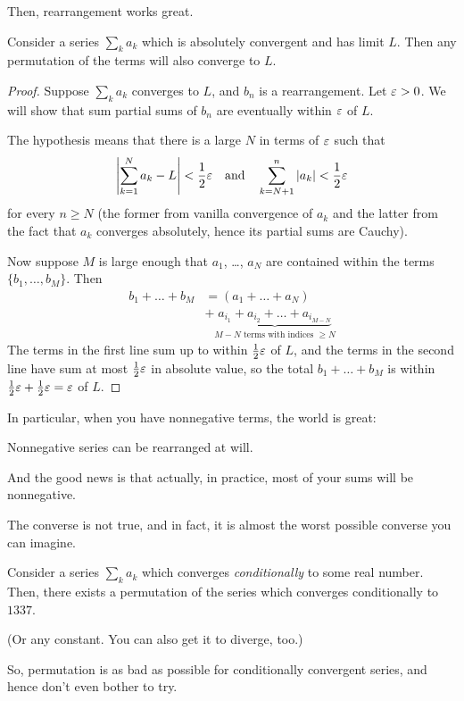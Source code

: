 Then, rearrangement works great.
\begin{theorem}
	Consider a series $\sum_k a_k$ which is absolutely convergent
	and has limit $L$.
	Then any permutation of the terms will also converge to $L$.
\end{theorem}
\begin{proof}
	Suppose $\sum_k a_k$ converges to $L$,
	and $b_n$ is a rearrangement.
	Let $\varepsilon > 0$.
	We will show that sum partial sums of $b_n$
	are eventually within $\varepsilon$ of $L$.

	The hypothesis means that there is a large $N$ in terms of $\varepsilon$
	such that
	\[ \left\lvert \sum_{k=1}^N a_k - L \right\rvert < \frac{1}{2}\varepsilon
		\quad\text{and}\quad
		\sum_{k = N+1}^{n} \left\lvert a_k \right\rvert < \frac{1}{2}\varepsilon
	\]
	for every $n \ge N$ (the former from vanilla convergence of $a_k$
	and the latter from the fact that $a_k$ converges absolutely,
	hence its partial sums are Cauchy).

	Now suppose $M$ is large enough that $a_1$, \dots, $a_N$
	are contained within the terms $\{b_1, \dots, b_M\}$.
	Then
	\begin{align*}
		b_1 + \dots + b_M
		&= (a_1 + \dots + a_N) \\
		&+ \underbrace{a_{i_1} + a_{i_2} + \dots + a_{i_{M-N}}}%
		_{\text{$M-N$ terms with indices $\ge N$}}
	\end{align*}
	The terms in the first line sum up to within $\frac{1}{2}\varepsilon$ of $L$,
	and the terms in the second line have sum at most $\frac{1}{2}\varepsilon$
	in absolute value, so the total $b_1 + \dots + b_M$
	is within $\frac{1}{2}\varepsilon + \frac{1}{2}\varepsilon = \varepsilon$ of $L$.
\end{proof}
In particular, when you have nonnegative terms, the world is great:
\begin{moral}
	Nonnegative series can be rearranged at will.
\end{moral}
And the good news is that actually,
in practice, most of your sums will be nonnegative.

The converse is not true,
and in fact, it is almost the worst possible converse you can imagine.
\begin{theorem}
	Consider a series $\sum_k a_k$ which converges \emph{conditionally}
	to some real number.
	Then, there exists a permutation of the series
	which converges conditionally to $1337$.

	(Or any constant.  You can also get it to diverge, too.)
\end{theorem}
So, permutation is as bad as possible for conditionally convergent
series, and hence don't even bother to try.

